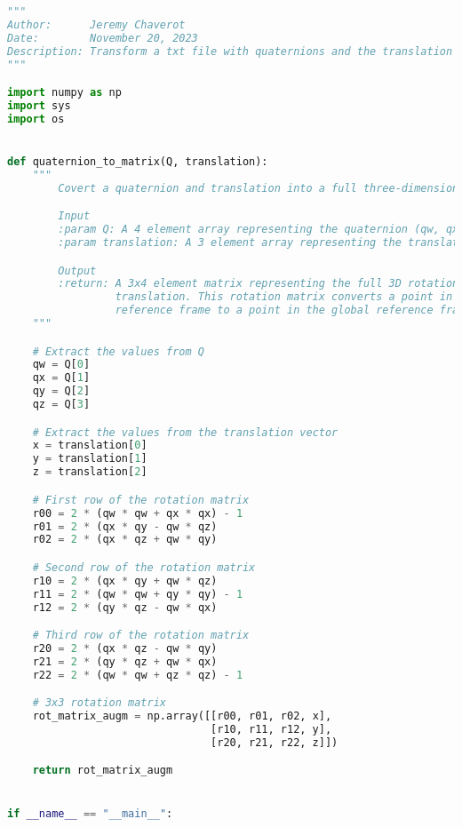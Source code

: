 \begin{lstlisting}[language=Python, label=lst:3, caption=Python script \texttt{quaternion\_to\_matrix.py} to transform a txt file with quaternions and the translation vector into multiple npy files containing the rotation matrix augmented with the translation vector.]
"""
Author:      Jeremy Chaverot
Date:        November 20, 2023
Description: Transform a txt file with quaternions and the translation vector into multiple npy files containing the rotation matrix augmented with the translation vector.
"""

import numpy as np
import sys
import os


def quaternion_to_matrix(Q, translation):
    """
        Covert a quaternion and translation into a full three-dimensional augmented rotation matrix.

        Input
        :param Q: A 4 element array representing the quaternion (qw, qx, qy, qz).
        :param translation: A 3 element array representing the translation (x, y, z).

        Output
        :return: A 3x4 element matrix representing the full 3D rotation matrix with
                 translation. This rotation matrix converts a point in the local
                 reference frame to a point in the global reference frame.
    """

    # Extract the values from Q
    qw = Q[0]
    qx = Q[1]
    qy = Q[2]
    qz = Q[3]

    # Extract the values from the translation vector
    x = translation[0]
    y = translation[1]
    z = translation[2]

    # First row of the rotation matrix
    r00 = 2 * (qw * qw + qx * qx) - 1
    r01 = 2 * (qx * qy - qw * qz)
    r02 = 2 * (qx * qz + qw * qy)

    # Second row of the rotation matrix
    r10 = 2 * (qx * qy + qw * qz)
    r11 = 2 * (qw * qw + qy * qy) - 1
    r12 = 2 * (qy * qz - qw * qx)

    # Third row of the rotation matrix
    r20 = 2 * (qx * qz - qw * qy)
    r21 = 2 * (qy * qz + qw * qx)
    r22 = 2 * (qw * qw + qz * qz) - 1

    # 3x3 rotation matrix
    rot_matrix_augm = np.array([[r00, r01, r02, x],
                                [r10, r11, r12, y],
                                [r20, r21, r22, z]])

    return rot_matrix_augm


if __name__ == "__main__":


\end{lstlisting}
